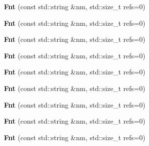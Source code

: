 \begin{DoxyCompactItemize}
{\bfseries Fnt} (const std\+::string \&nm, std\+::size\+\_\+t refs=0)
\item 
\mbox{\label{class_fnt_a333724637c8eef176138898f68e57470}} 
{\bfseries Fnt} (const std\+::string \&nm, std\+::size\+\_\+t refs=0)
\item 
\mbox{\label{class_fnt_a333724637c8eef176138898f68e57470}} 
{\bfseries Fnt} (const std\+::string \&nm, std\+::size\+\_\+t refs=0)
\item 
\mbox{\label{class_fnt_a333724637c8eef176138898f68e57470}} 
{\bfseries Fnt} (const std\+::string \&nm, std\+::size\+\_\+t refs=0)
\item 
\mbox{\label{class_fnt_a333724637c8eef176138898f68e57470}} 
{\bfseries Fnt} (const std\+::string \&nm, std\+::size\+\_\+t refs=0)
\item 
\mbox{\label{class_fnt_a333724637c8eef176138898f68e57470}} 
{\bfseries Fnt} (const std\+::string \&nm, std\+::size\+\_\+t refs=0)
\item 
\mbox{\label{class_fnt_a333724637c8eef176138898f68e57470}} 
{\bfseries Fnt} (const std\+::string \&nm, std\+::size\+\_\+t refs=0)
\item 
\mbox{\label{class_fnt_a333724637c8eef176138898f68e57470}} 
{\bfseries Fnt} (const std\+::string \&nm, std\+::size\+\_\+t refs=0)
\item 
\mbox{\label{class_fnt_a333724637c8eef176138898f68e57470}} 
{\bfseries Fnt} (const std\+::string \&nm, std\+::size\+\_\+t refs=0)
\end{DoxyCompactItemize}


